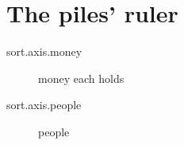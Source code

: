 \section{The piles' ruler}

\begin{description}
  \item[sort.axis.money] money each holds
  \item[sort.axis.people] people
\end{description}
